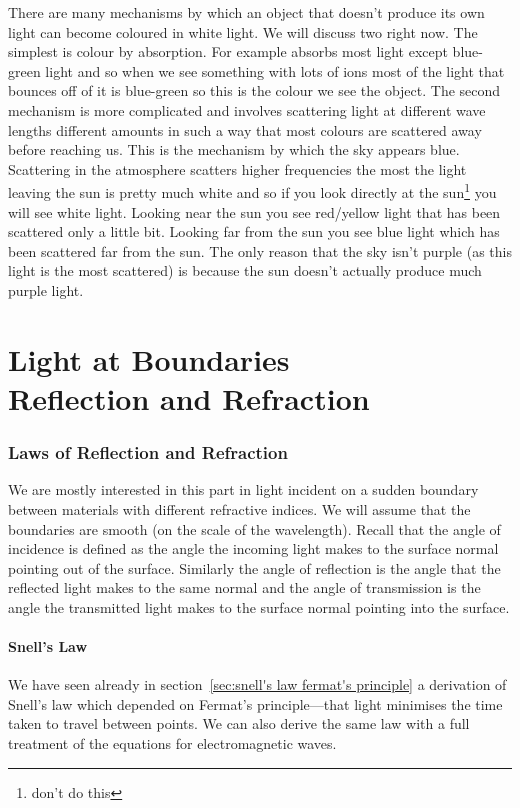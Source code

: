     There are many mechanisms by which an object that doesn't produce its own light can become coloured in white light.
    We will discuss two right now.
    The simplest is colour by absorption.
    For example  absorbs most light except blue-green light and so when we see something with lots of  ions most of the light that bounces off of it is blue-green so this is the colour we see the object.
    The second mechanism is more complicated and involves scattering light at different wave lengths different amounts in such a way that most colours are scattered away before reaching us.
    This is the mechanism by which the sky appears blue.
    Scattering in the atmosphere scatters higher frequencies the most the light leaving the sun is pretty much white and so if you look directly at the sun\footnote{don't do this} you will see white light.
    Looking near the sun you see red/yellow light that has been scattered only a little bit.
    Looking far from the sun you see blue light which has been scattered far from the sun.
    The only reason that the sky isn't purple (as this light is the most scattered) is because the sun doesn't actually produce much purple light.
    
    \part[Light at Boundaries -- Reflection and Refraction]{Light at Boundaries\\{\LARGE Reflection and Refraction}}
    \section{Laws of Reflection and Refraction}
    We are mostly interested in this part in light incident on a sudden boundary between materials with different refractive indices.
    We will assume that the boundaries are smooth (on the scale of the wavelength).
    Recall that the angle of incidence is defined as the angle the incoming light makes to the surface normal pointing out of the surface.
    Similarly the angle of reflection is the angle that the reflected light makes to the same normal and the angle of transmission is the angle the transmitted light makes to the surface normal pointing into the surface.
    
    \subsection{Snell's Law}
    We have seen already in section~\ref{sec:snell's law fermat's principle} a derivation of Snell's law which depended on Fermat's principle---that light minimises the time taken to travel between points.
    We can also derive the same law with a full treatment of the equations for electromagnetic waves.
    
